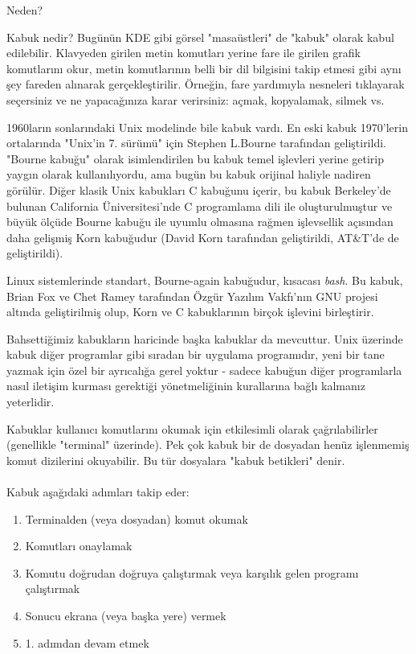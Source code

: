 \begin{section}{Neden?}
\begin{subsection}{Kabuk nedir?}
Bugünün KDE gibi görsel "masaüstleri" de "kabuk" olarak kabul edilebilir. Klavyeden girilen metin komutları yerine fare ile girilen grafik komutlarını okur, metin komutlarının belli bir dil bilgisini takip etmesi gibi aynı şey fareden alınarak gerçekleştirilir. Örneğin, fare yardımıyla nesneleri tıklayarak seçersiniz ve ne yapacağınıza karar verirsiniz: açmak, kopyalamak, silmek vs.

1960ların sonlarındaki Unix modelinde bile kabuk vardı. En eski kabuk 1970'lerin ortalarında "Unix'in 7. sürümü" için Stephen L.Bourne tarafından geliştirildi. "Bourne kabuğu" olarak isimlendirilen bu kabuk temel işlevleri yerine getirip yaygın olarak kullanılıyordu, ama bugün bu kabuk orijinal haliyle nadiren görülür. Diğer klasik Unix kabukları C kabuğunu içerir, bu kabuk Berkeley'de bulunan California Üniversitesi'nde C programlama dili ile oluşturulmuştur ve büyük ölçüde Bourne kabuğu ile uyumlu olmasına rağmen işlevsellik açısından daha gelişmiş Korn kabuğudur (David Korn tarafından geliştirildi, AT\&T'de de geliştirildi).

Linux sistemlerinde standart, Bourne-again kabuğudur, kısacası \emph{bash}. Bu kabuk, Brian Fox ve Chet Ramey tarafından Özgür Yazılım Vakfı'nın GNU projesi altında geliştirilmiş olup, Korn ve C kabuklarının birçok işlevini birleştirir.

Bahsettiğimiz kabukların haricinde başka kabuklar da mevcuttur. Unix üzerinde kabuk diğer programlar gibi sıradan bir uygulama programıdır, yeni bir tane yazmak için özel bir ayrıcalığa gerel yoktur - sadece kabuğun diğer programlarla nasıl iletişim kurması gerektiği yönetmeliğinin kurallarına bağlı kalmanız yeterlidir.

Kabuklar kullanıcı komutlarını okumak için etkilesimli olarak çağrılabilirler (genellikle "terminal" üzerinde). Pek çok kabuk bir de dosyadan henüz işlenmemiş komut dizilerini okuyabilir. Bu tür dosyalara "kabuk betikleri" denir.
\paragraph{}{Kabuk aşağıdaki adımları takip eder:
\begin{enumerate}
\item Terminalden (veya dosyadan) komut okumak
\item Komutları onaylamak
\item Komutu doğrudan doğruya çalıştırmak veya karşılık gelen programı çalıştırmak
\item Sonucu ekrana (veya başka yere) vermek
\item 1. adımdan devam etmek
\end{enumerate}}


\end{subsection}
\end{section}
